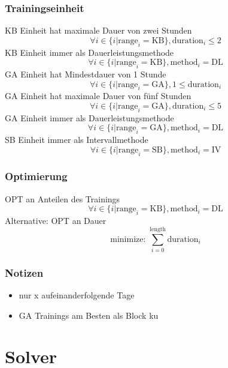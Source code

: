     \subsubsection{Trainingseinheit}
    KB Einheit hat maximale Dauer von zwei Stunden
        \begin{equation}
            \forall i \in \{i | \text{range}_i = \text{KB}\}, \text{duration}_i \leq 2
        \end{equation}
    KB Einheit immer als Dauerleistungsmethode
        \begin{equation}
            \forall i \in \{i | \text{range}_i = \text{KB}\}, \text{method}_i = \text{DL}
        \end{equation}
    GA Einheit hat Mindestdauer von 1 Stunde
        \begin{equation}
            \forall i \in \{i | \text{range}_i = \text{GA}\}, 1 \leq \text{duration}_i
        \end{equation}
    GA Einheit hat maximale Dauer von fünf Stunden
        \begin{equation}
            \forall i \in \{i | \text{range}_i = \text{GA}\}, \text{duration}_i \leq 5
        \end{equation}
    GA Einheit immer als Dauerleistungsmethode
        \begin{equation}
            \forall i \in \{i | \text{range}_i = \text{GA}\}, \text{method}_i = \text{DL}
        \end{equation}
    SB Einheit immer als Intervallmethode
        \begin{equation}
            \forall i \in \{i | \text{range}_i = \text{SB}\}, \text{method}_i = \text{IV}
        \end{equation}
        
    \subsubsection{Optimierung}
    OPT an Anteilen des Trainings 
        \begin{equation}
            \forall i \in \{i | \text{range}_i = \text{KB}\}, \text{method}_i = \text{DL}
        \end{equation}
    Alternative: OPT an Dauer 
        \begin{equation}
            \text{minimize: } \sum_{i=0}^{\text{length}} \text{duration}_i
        \end{equation}
    
    
    \subsubsection{Notizen}
        \begin{itemize}
            \item nur x aufeinanderfolgende Tage
            \item GA Trainings am Besten als Block \cite[34]{Radsporttraining}ku
        \end{itemize}
\section{Solver}
    